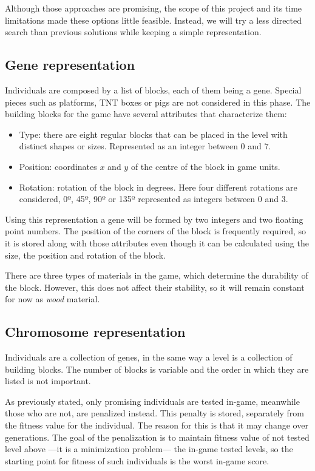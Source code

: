 Although those approaches are promising, the scope of this project and its time limitations made these options little feasible. Instead, we will try a less directed search than previous solutions while keeping a simple representation. 
\subsection{Gene representation}
Individuals are composed by a list of blocks, each of them being a gene. Special pieces such as platforms, TNT boxes or pigs are not considered in this phase. The building blocks for the game have several attributes that characterize them: 

\begin{itemize}
	\item Type: there are eight regular blocks that can be placed in the level with distinct shapes or sizes. Represented as an integer between $0$ and $7$.
	\item Position: coordinates $x$ and $y$ of the centre of the block in game units.
	\item Rotation: rotation of the block in degrees. Here four different rotations are considered, 0º, 45º, 90º or 135º represented as integers between $0$ and $3$.
\end{itemize}

Using this representation a gene will be formed by two integers and two floating point numbers.
The position of the corners of the block is frequently required, so it is stored along with those attributes even though it can be calculated using the size, the position and rotation of the block. 

There are three types of materials in the game, which determine the durability of the block. However, this does not affect their stability, so it will remain constant for now as \textit{wood} material.


\subsection{Chromosome representation}

Individuals are a collection of genes, in the same way a level is a collection of building blocks. The number of blocks is variable and the order in which they are listed is not important. 

As previously stated, only promising individuals are tested in-game, meanwhile those who are not, are penalized instead. This penalty is stored, separately from the fitness value for the individual. The reason for this is that it may change over generations. The goal of the penalization is to maintain fitness value of not tested level above ---it is a minimization problem--- the in-game tested levels, so the starting point for fitness of such individuals is the worst in-game score.

